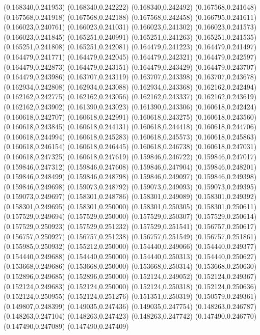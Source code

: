 (0.168340,0.241953)
(0.168340,0.242222)
(0.168340,0.242492)
(0.167568,0.241648)
(0.167568,0.241918)
(0.167568,0.242188)
(0.167568,0.242458)
(0.166795,0.241611)
(0.166023,0.240761)
(0.166023,0.241031)
(0.166023,0.241302)
(0.166023,0.241573)
(0.166023,0.241845)
(0.165251,0.240991)
(0.165251,0.241263)
(0.165251,0.241535)
(0.165251,0.241808)
(0.165251,0.242081)
(0.164479,0.241223)
(0.164479,0.241497)
(0.164479,0.241771)
(0.164479,0.242045)
(0.164479,0.242321)
(0.164479,0.242597)
(0.164479,0.242873)
(0.164479,0.243151)
(0.164479,0.243429)
(0.164479,0.243707)
(0.164479,0.243986)
(0.163707,0.243119)
(0.163707,0.243398)
(0.163707,0.243678)
(0.162934,0.242808)
(0.162934,0.243088)
(0.162934,0.243368)
(0.162162,0.242494)
(0.162162,0.242775)
(0.162162,0.243056)
(0.162162,0.243337)
(0.162162,0.243619)
(0.162162,0.243902)
(0.161390,0.243023)
(0.161390,0.243306)
(0.160618,0.242424)
(0.160618,0.242707)
(0.160618,0.242991)
(0.160618,0.243275)
(0.160618,0.243560)
(0.160618,0.243845)
(0.160618,0.244131)
(0.160618,0.244418)
(0.160618,0.244706)
(0.160618,0.244994)
(0.160618,0.245283)
(0.160618,0.245573)
(0.160618,0.245863)
(0.160618,0.246154)
(0.160618,0.246445)
(0.160618,0.246738)
(0.160618,0.247031)
(0.160618,0.247325)
(0.160618,0.247619)
(0.159846,0.246722)
(0.159846,0.247017)
(0.159846,0.247312)
(0.159846,0.247608)
(0.159846,0.247904)
(0.159846,0.248201)
(0.159846,0.248499)
(0.159846,0.248798)
(0.159846,0.249097)
(0.159846,0.249398)
(0.159846,0.249698)
(0.159073,0.248792)
(0.159073,0.249093)
(0.159073,0.249395)
(0.159073,0.249697)
(0.158301,0.248786)
(0.158301,0.249089)
(0.158301,0.249392)
(0.158301,0.249695)
(0.158301,0.250000)
(0.158301,0.250305)
(0.158301,0.250611)
(0.157529,0.249694)
(0.157529,0.250000)
(0.157529,0.250307)
(0.157529,0.250614)
(0.157529,0.250923)
(0.157529,0.251232)
(0.157529,0.251541)
(0.156757,0.250617)
(0.156757,0.250927)
(0.156757,0.251238)
(0.156757,0.251549)
(0.156757,0.251861)
(0.155985,0.250932)
(0.155212,0.250000)
(0.154440,0.249066)
(0.154440,0.249377)
(0.154440,0.249688)
(0.154440,0.250000)
(0.154440,0.250313)
(0.154440,0.250627)
(0.153668,0.249686)
(0.153668,0.250000)
(0.153668,0.250314)
(0.153668,0.250630)
(0.152896,0.249685)
(0.152896,0.250000)
(0.152124,0.249052)
(0.152124,0.249367)
(0.152124,0.249683)
(0.152124,0.250000)
(0.152124,0.250318)
(0.152124,0.250636)
(0.152124,0.250955)
(0.152124,0.251276)
(0.151351,0.250319)
(0.150579,0.249361)
(0.149807,0.248399)
(0.149035,0.247436)
(0.149035,0.247754)
(0.148263,0.246787)
(0.148263,0.247104)
(0.148263,0.247423)
(0.148263,0.247742)
(0.147490,0.246770)
(0.147490,0.247089)
(0.147490,0.247409)
